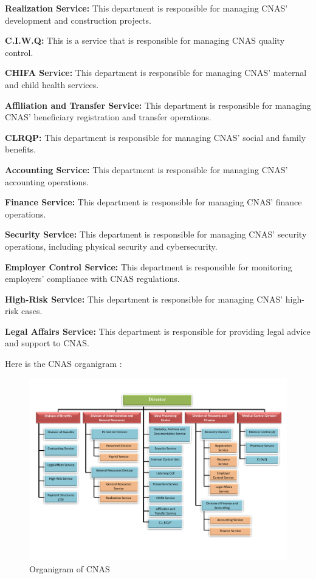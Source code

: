\textbf{Realization Service:} This department is responsible for managing CNAS' development and construction projects.

\textbf{C.I.W.Q:} This is a service that is responsible for managing CNAS quality control.

\textbf{CHIFA Service:} This department is responsible for managing CNAS' maternal and child health services.

\textbf{Affiliation and Transfer Service:} This department is responsible for managing CNAS' beneficiary registration and transfer operations.

\textbf{CLRQP:} This department is responsible for managing CNAS' social and family benefits.

\textbf{Accounting Service:} This department is responsible for managing CNAS' accounting operations.

\textbf{Finance Service:} This department is responsible for managing CNAS' finance operations.

\textbf{Security Service:} This department is responsible for managing CNAS' security operations, including physical security and cybersecurity.

\textbf{Employer Control Service:} This department is responsible for monitoring employers' compliance with CNAS regulations.

\textbf{High-Risk Service:} This department is responsible for managing CNAS' high-risk cases.

\textbf{Legal Affairs Service:} This department is responsible for providing legal advice and support to CNAS.
\medskip

Here is the CNAS organigram : 
\begin{figure}[h]
  \centering
  \includegraphics[width=1.0\textwidth]{cnas organigramme-1.png}
  \caption{Organigram of CNAS}
  \label{fig:organigram}
\end{figure}
